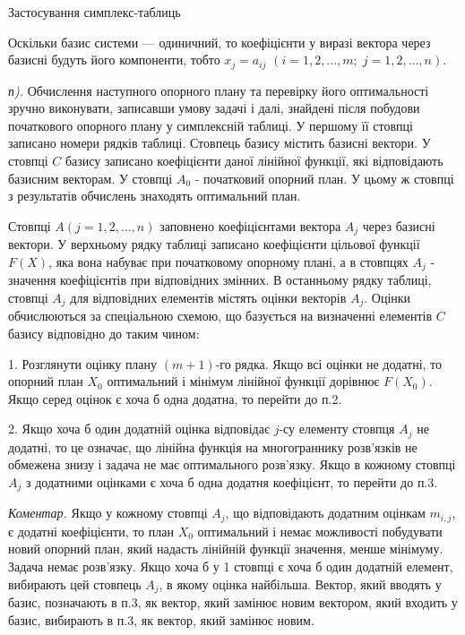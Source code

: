 \medskip

\noindent Застосування симплекс-таблиць

\noindent Оскільки базис системи — одиничний, то коефіцієнти у виразі вектора через базисні будуть його компоненти, тобто $x_j = a_{ij}$ $(i=1,2,...,m;\; j=1,2,...,n)$.

\noindent \textit{п).} Обчислення наступного опорного плану та перевірку його оптимальності зручно виконувати, записавши умову задачі і далі, знайдені після побудови початкового опорного плану у симплексній таблиці. У першому її стовпці записано номери рядків таблиці. Стовпець базису містить базисні вектори. У стовпці $C$ базису записано коефіцієнти даної лінійної функції, які відповідають базисним векторам. У стовпці $A_0$ - початковий опорний план. У цьому ж стовпці з результатів обчислень знаходять оптимальний план.

Стовпці $A(j = 1,2,\ldots,n)$ заповнено коефіцієнтами вектора $A_j$ через базисні вектори. У верхньому рядку таблиці записано коефіцієнти цільової функції $F(X)$, яка вона набуває при початковому опорному плані, а в стовпцях $A_j$ - значення коефіцієнтів при відповідних змінних. В останньому рядку таблиці, стовпці $A_j$ для відповідних елементів містять оцінки векторів $A_j$. Оцінки обчислюються за спеціальною схемою, що базується на визначенні елементів $C$ базису відповідно до таким чином:

1. Розглянути оцінку плану $(m+1)$-го рядка. Якщо всі оцінки не додатні, то опорний план $X_0$ оптимальний і мінімум лінійної функції дорівнює $F(X_0)$. Якщо серед оцінок є хоча б одна додатна, то перейти до п.2.

2. Якщо хоча б один додатній оцінка відповідає $j$-су елементу стовпця $A_j$ не додатні, то це означає, що лінійна функція на многограннику розв’язків не обмежена знизу і задача не має оптимального розв’язку. Якщо в кожному стовпці $A_j$ з додатними оцінками є хоча б одна додатня коефіцієнт, то перейти до п.3.

\textit{Коментар.} Якщо у кожному стовпці $A_j$, що відповідають додатним оцінкам $m_{i,j}$, є додатні коефіцієнти, то план $X_0$ оптимальний і немає можливості побудувати новий опорний план, який надасть лінійній функції значення, менше мінімуму. Задача немає розв’язку. Якщо хоча б у 1 стовпці є хоча б один додатній елемент, вибирають цей стовпець $A_j$, в якому оцінка найбільша. Вектор, який вводять у базис, позначають в п.3, як вектор, який замінює новим вектором, який входить у базис, вибирають в п.3, як вектор, який замінює новим.

